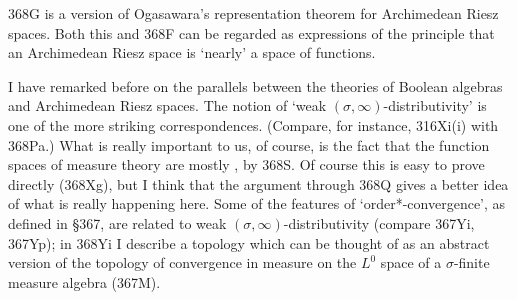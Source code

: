 {368G is a version of Ogasawara's representation theorem for Archimedean
Riesz spaces.   Both this and 368F can be regarded as expressions of the
principle that an Archimedean Riesz space is `nearly' a space of
functions.

I have remarked before on the parallels between the theories of Boolean
algebras and Archimedean Riesz spaces.   The notion of
`weak $(\sigma,\infty)$-distributivity' is one of the more striking
correspondences.   (Compare, for instance, 316Xi(i) with 368Pa.)   What is
really important to us, of course, is the fact that the function spaces
of measure theory are mostly \wsid, by 368S.   Of course this is easy to
prove directly (368Xg), but I think that the argument through 368Q gives
a better idea of what is really happening here.   Some of the features
of `order*-convergence', as defined in \S367, are related to weak
$(\sigma,\infty)$-distributivity (compare 367Yi, 367Yp);
in 368Yi I describe a topology which
can be thought of as an abstract version of the topology of convergence
in measure on the $L^0$ space of a $\sigma$-finite measure algebra
(367M).
}%

\discrpage


